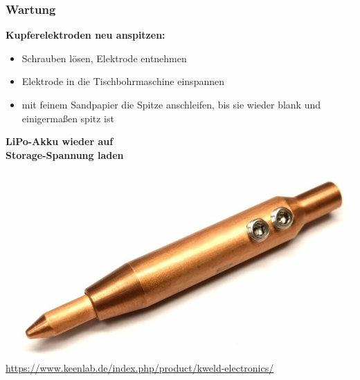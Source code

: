 \documentclass[handout, usenames,dvipsnames, nosymbols,aspectratio=169]{beamer}
\begin{document}
	\begin{frame}
	\frametitle{Wartung}
	 \textbf{ Kupferelektroden neu anspitzen:}\\[0.5em]
	  \begin{minipage}{0.5\textwidth}
		  \begin{itemize}
		  	\item Schrauben lösen, Elektrode entnehmen
		  	\item Elektrode in die Tischbohrmaschine einspannen
		  	\item mit feinem Sandpapier die Spitze anschleifen, bis sie wieder blank und einigermaßen spitz ist
		  \end{itemize}
	 	\textbf{LiPo-Akku wieder auf \\Storage-Spannung laden}
	  \end{minipage}
	  \hfill
	  \begin{minipage}{0.4\textwidth}
	  	 \includegraphics[width=\textwidth]{images/kWeld-new-electrodes-800x429.jpg}
	  	 \tiny
	  	 {\color{gray}\url{https://www.keenlab.de/index.php/product/kweld-electronics/}}
	  \end{minipage}
	\end{frame}
\end{document}
